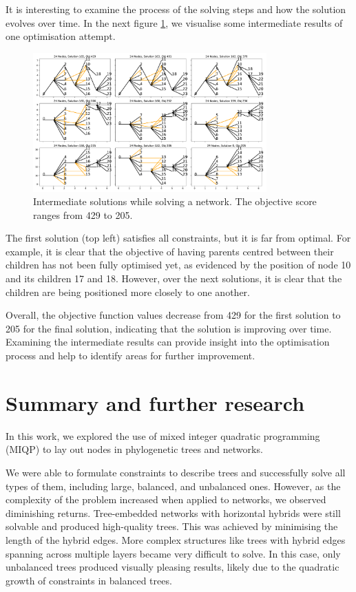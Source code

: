 \documentclass{article}
\begin{document}
It is interesting to examine the process of the solving steps and how the solution evolves over time. In the next figure \ref{fig:network_process}, we visualise some intermediate results of one optimisation attempt.
\begin{figure}[H]
    \centering
    \includegraphics[width=0.8\textwidth]{figures/network_process.pdf}
    \caption{Intermediate solutions while solving a network. The objective score ranges from 429 to 205.}
    \label{fig:network_process}
\end{figure}

The first solution (top left) satisfies all constraints, but it is far from optimal. For example, it is clear that the objective of having parents centred between their children has not been fully optimised yet, as evidenced by the position of node 10 and its children 17 and 18. However, over the next solutions, it is clear that the children are being positioned more closely to one another.

Overall, the objective function values decrease from 429 for the first solution to 205 for the final solution, indicating that the solution is improving over time. Examining the intermediate results can provide insight into the optimisation process and help to identify areas for further improvement.

\section*{Summary and further research}
In this work, we explored the use of mixed integer quadratic programming (\ac{MIQP}) to lay out nodes in phylogenetic trees and networks.

We were able to formulate constraints to describe trees and successfully solve all types of them, including large, balanced, and unbalanced ones. However, as the complexity of the problem increased when applied to networks, we observed diminishing returns. Tree-embedded networks with horizontal hybrids were still solvable and produced high-quality trees. This was achieved by minimising the length of the hybrid edges. More complex structures like trees with hybrid edges spanning across multiple layers became very difficult to solve. In this case, only unbalanced trees produced visually pleasing results, likely due to the quadratic growth of constraints in balanced trees.
\end{document}
